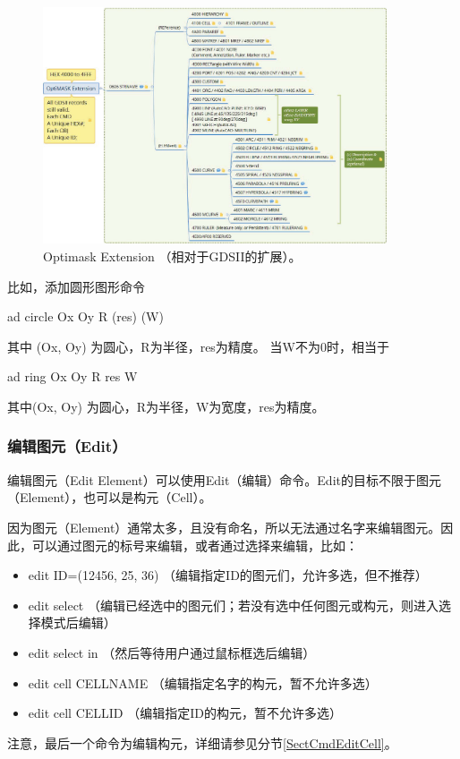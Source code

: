 \begin{figure}[htb!p] %
	\centering
	\includegraphics[width=4in]{./Layout/FigsCmd/Optimask_Ext_REF_ELEM.eps}
	\caption{Optimask Extension （相对于GDSII的扩展）。}
	\label{FigExtRefElem}
\end{figure}

比如，添加圆形图形命令

ad circle Ox Oy R (res) (W)

其中 (Ox, Oy) 为圆心，R为半径，res为精度。
当W不为0时，相当于

ad ring Ox Oy R res W

其中(Ox, Oy) 为圆心，R为半径，W为宽度，res为精度。

\subsubsection{编辑图元（Edit）} \label{SectCmdEditElem}
编辑图元（Edit Element）可以使用Edit（编辑）命令。Edit的目标不限于图元（Element），也可以是构元（Cell）。

因为图元（Element）通常太多，且没有命名，所以无法通过名字来编辑图元。因此，可以通过图元的标号来编辑，或者通过选择来编辑，比如：

\begin{itemize}
	\item edit ID=(12456, 25, 36) （编辑指定ID的图元们，允许多选，但不推荐）
	\item edit select （编辑已经选中的图元们；若没有选中任何图元或构元，则进入选择模式后编辑）
	\item edit select in  （然后等待用户通过鼠标框选后编辑）
	\item edit cell CELLNAME （编辑指定名字的构元，暂不允许多选）
	\item edit cell CELLID （编辑指定ID的构元，暂不允许多选）
\end{itemize}
注意，最后一个命令为编辑构元，详细请参见分节\ref{SectCmdEditCell}。

